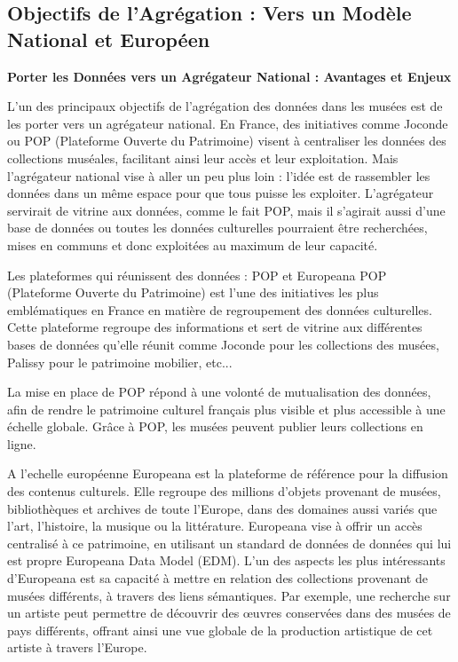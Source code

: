 \subsection{Objectifs de l'Agrégation : Vers un Modèle National et Européen} 

\textbf{Porter les Données vers un Agrégateur National : Avantages et Enjeux}\newline

L'un des principaux objectifs de l'agrégation des données dans les musées est de les porter vers un agrégateur national. En France, des initiatives comme Joconde ou POP (Plateforme Ouverte du Patrimoine) visent à centraliser les données des collections muséales, facilitant ainsi leur accès et leur exploitation. Mais l'agrégateur national vise à aller un peu plus loin : l'idée est de rassembler les données dans un même espace pour que tous puisse les exploiter. L'agrégateur servirait de vitrine aux données, comme le fait POP, mais il s'agirait aussi d'une base de données ou toutes les données culturelles pourraient être recherchées, mises en communs et donc exploitées au maximum de leur capacité.\newline

Les plateformes qui réunissent des données : POP et Europeana
POP (Plateforme Ouverte du Patrimoine) est l'une des initiatives les plus emblématiques en France en matière de regroupement des données culturelles. Cette plateforme regroupe des informations  et sert de vitrine aux différentes bases de données qu'elle réunit comme Joconde pour les collections des musées, Palissy pour le patrimoine mobilier, etc... \newline

La mise en place de POP répond à une volonté de mutualisation des données, afin de rendre le patrimoine culturel français plus visible et plus accessible à une échelle globale. Grâce à POP, les musées peuvent publier leurs collections en ligne.  \newline

A l'echelle européenne Europeana est la plateforme de référence pour la diffusion des contenus culturels. Elle regroupe des millions d'objets provenant de musées, bibliothèques et archives de toute l'Europe, dans des domaines aussi variés que l'art, l'histoire, la musique ou la littérature. Europeana vise à offrir un accès centralisé à ce patrimoine, en utilisant un standard de données de données qui lui est propre  Europeana Data Model (EDM).
L'un des aspects les plus intéressants d'Europeana est sa capacité à mettre en relation des collections provenant de musées différents, à travers des liens sémantiques. Par exemple, une recherche sur un artiste peut permettre de découvrir des œuvres conservées dans des musées de pays différents, offrant ainsi une vue globale de la production artistique de cet artiste à travers l’Europe.\newline

